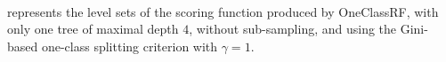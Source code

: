 \paragraph{}
 represents the level sets of the scoring function
produced by \ac{OneClassRF}, with only one tree 
of maximal depth $4$, 
without sub-sampling, and using the Gini-based one-class splitting criterion
with $\gamma=1$.
%
%
%
%

